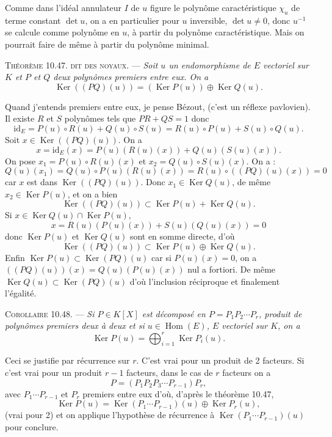 Comme dans l'idéal annulateur $I$ de $u$ figure le polynôme caractéristique $\chi_u$ de terme constant $\det u$, on a en particulier pour $u$ inversible, $\det u\ne0$, donc $u^{-1}$ se calcule comme polynôme en $u$, à partir du polynôme caractéristique. Mais on pourrait faire de même à partir du polynôme minimal. \bookend

\medskip\noindent\textsc{Théorème 10.47. dit des noyaux.} --- \emph{Soit $u$ un endomorphisme de $E$ vectoriel sur $K$ et $P$ et $Q$ deux polynômes premiers entre eux. On a
\[
\operatorname{Ker}((PQ)(u))=(\operatorname{Ker}P(u))\oplus\operatorname{Ker}Q(u).
\]}

Quand j'entends premiers entre eux, je pense Bézout, (c'est un réflexe pavlovien). Il existe $R$ et $S$ polynômes tels que $PR+QS=1$ donc
\[
\mathrm{id}_E=P(u)\circ R(u)+Q(u)\circ S(u)
=R(u)\circ P(u)+S(u)\circ Q(u).
\]
Soit $x\in\operatorname{Ker}((PQ)(u))$.
On a
\[
x=\mathrm{id}_E(x)=P(u)(R(u)(x))+Q(u)(S(u)(x)).
\]
On pose $x_1=P(u)\circ R(u)(x)$ et $x_2=Q(u)\circ S(u)(x)$. On a :
\[
Q(u)(x_1)=Q(u)\circ P(u)(R(u)(x))
=R(u)\circ((PQ)(u)(x))=0
\]
car $x$ est dans $\operatorname{Ker}((PQ)(u))$.
Donc $x_1\in\operatorname{Ker}Q(u)$, de même $x_2\in\operatorname{Ker}P(u)$, et on a bien
\[
\operatorname{Ker}((PQ)(u))\subset \operatorname{Ker}P(u)+\operatorname{Ker}Q(u).
\]
Si $x\in\operatorname{Ker}Q(u)\cap\operatorname{Ker}P(u)$,
\[
x=R(u)(P(u)(x))+S(u)(Q(u)(x))=0
\]
donc $\operatorname{Ker}P(u)$ et $\operatorname{Ker}Q(u)$ sont en somme directe, d'où
\[
\operatorname{Ker}((PQ)(u))\subset \operatorname{Ker}P(u)\oplus\operatorname{Ker}Q(u).
\]
Enfin $\operatorname{Ker}P(u)\subset\operatorname{Ker}(PQ)(u)$ car si $P(u)(x)=0$, on a $((PQ)(u))(x)=Q(u)(P(u)(x))$ nul a fortiori. De même $\operatorname{Ker}Q(u)\subset\operatorname{Ker}(PQ)(u)$ d'où l'inclusion réciproque et finalement l'égalité. \bookend

\medskip\noindent\textsc{Corollaire 10.48.} --- \emph{Si $P\in K[X]$ est décomposé en $P=P_1P_2\cdots P_r$, produit de polynômes premiers deux à deux et si $u\in\operatorname{Hom}(E)$, $E$ vectoriel sur $K$, on a
\[
\operatorname{Ker}P(u)=\bigoplus_{i=1}^r\operatorname{Ker}P_i(u).
\]}

Ceci se justifie par récurrence sur $r$. C'est vrai pour un produit de 2 facteurs. Si c'est vrai pour un produit $r-1$ facteurs, dans le cas de $r$ facteurs on a
\[
P=(P_1P_2P_3\cdots P_{r-1})P_r,
\]
avec $P_1\cdots P_{r-1}$ et $P_r$ premiers entre eux d'où, d'après le théorème 10.47,
\[
\operatorname{Ker}P(u)=\operatorname{Ker}(P_1\cdots P_{r-1})(u)\oplus\operatorname{Ker}P_r(u),
\]
(vrai pour 2) et on applique l'hypothèse de récurrence à $\operatorname{Ker}(P_1\cdots P_{r-1})(u)$ pour conclure. \bookend

